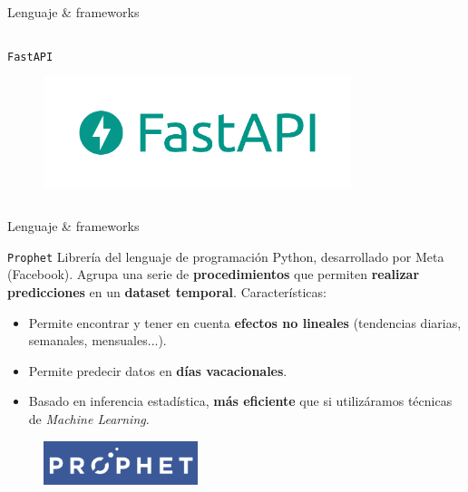\documentclass[aspectratio=169,xcolor=dvipsnames]{beamer}
\begin{document}
\begin{frame}{Lenguaje \& frameworks}
\begin{columns}
\begin{column}{0.5\textwidth}
\begin{exampleblock}{\texttt{FastAPI}}
					\begin{figure}[h!]
						\begin{center}
							\includegraphics[width=0.8\textwidth]{img/fastapi_logo.png}
						\end{center}
					\end{figure}
				\end{exampleblock}
				
				
			\end{column}
		\end{columns}
	\end{frame}

	\begin{frame}{Lenguaje \& frameworks}
		\begin{exampleblock}{\texttt{Prophet}}
			Librería del lenguaje de programación Python, desarrollado por Meta (Facebook). Agrupa una serie de \textbf{procedimientos} que permiten \textbf{realizar predicciones} en un \textbf{dataset temporal}. Características:
			
			\begin{itemize}
				\item Permite encontrar y tener en cuenta \textbf{efectos no lineales} (tendencias diarias, semanales, mensuales...).
				\item Permite predecir datos en \textbf{días vacacionales}.
				\item Basado en inferencia estadística, \textbf{más eficiente} que si utilizáramos técnicas de \textit{Machine Learning}.
			\end{itemize}
			
			\begin{figure}[h!]
				\begin{center}
					\includegraphics[width=0.4\textwidth]{img/prophet_logo.png}
				\end{center}
			\end{figure}
		\end{exampleblock}
	\end{frame}
	
\end{document}
